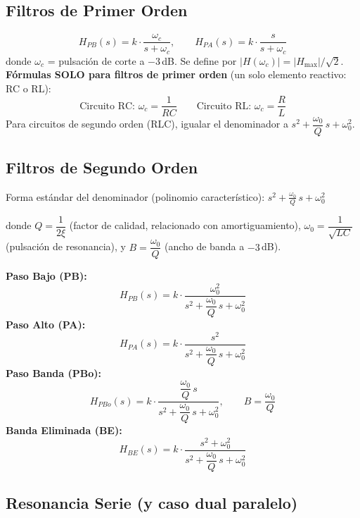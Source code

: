 \documentclass[12pt,a4paper]{article}
\begin{document}
\subsection{Filtros de Primer Orden}

\begin{formulabox}
\[
  H_{PB}(s) = k\cdot\frac{\omega_c}{s+\omega_c}, \qquad
  H_{PA}(s) = k\cdot\frac{s}{s+\omega_c}
\]
donde $\omega_c$ = pulsación de corte a $-3$\,dB. Se define por $|H(\omega_c)| = |H_{\max}|/\sqrt{2}$.\\[4pt]
\textbf{Fórmulas SOLO para filtros de primer orden} (un solo elemento reactivo: RC o RL):
\[
  \text{Circuito RC: }\omega_c = \frac{1}{RC} \qquad \text{Circuito RL: }\omega_c = \frac{R}{L}
\]
Para circuitos de segundo orden (RLC), igualar el denominador a $s^2 + \dfrac{\omega_0}{Q}\,s + \omega_0^2$.
\end{formulabox}
\clearpage %
\subsection{Filtros de Segundo Orden}

Forma estándar del denominador (polinomio característico):
$\displaystyle s^2 + \frac{\omega_0}{Q}\,s + \omega_0^2$

donde $Q = \dfrac{1}{2\xi}$ (factor de calidad, relacionado con amortiguamiento),
$\omega_0 = \dfrac{1}{\sqrt{LC}}$ (pulsación de resonancia), y $B = \dfrac{\omega_0}{Q}$ (ancho de banda a $-3$\,dB).

\begin{formulabox}
\textbf{Paso Bajo (PB):}
\[
  H_{PB}(s) = k\cdot
  \frac{\omega_0^2}{s^2 + \dfrac{\omega_0}{Q}\,s + \omega_0^2}
\]
\textbf{Paso Alto (PA):}
\[
  H_{PA}(s) = k\cdot
  \frac{s^2}{s^2 + \dfrac{\omega_0}{Q}\,s + \omega_0^2}
\]
\textbf{Paso Banda (PBo):}
\[
  H_{PBo}(s) = k\cdot
  \frac{\dfrac{\omega_0}{Q}\,s}{s^2 + \dfrac{\omega_0}{Q}\,s + \omega_0^2},
  \qquad B = \frac{\omega_0}{Q}
\]
\textbf{Banda Eliminada (BE):}
\[
  H_{BE}(s) = k\cdot
  \frac{s^2 + \omega_0^2}{s^2 + \dfrac{\omega_0}{Q}\,s + \omega_0^2}
\]
\end{formulabox}
\clearpage %
\subsection{Resonancia Serie (y caso dual paralelo)}
\end{document}
